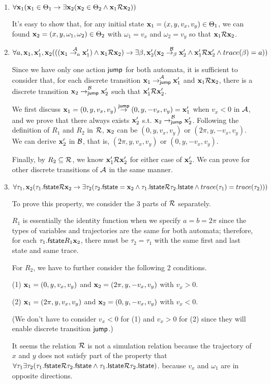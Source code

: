 \documentclass[11pt]{article}
\begin{document}
\begin{enumerate}
\item $\forall {\bf x}_1({\bf x}_1 \in \Theta_1 \to \exists {\bf x}_2({\bf x}_2 \in \Theta_2 \land {\bf x}_1 {\cal R} {\bf x}_2))$

It's easy to show that, for any initial state ${\bf x}_1 = (x, y, v_x, v_y) \in \Theta_1$,
we can found ${\bf x}_2 = (x, y, \omega_1, \omega_2) \in \Theta_2$ with $\omega_1 = v_x$ and $\omega_2 = v_y$
so that ${\bf x}_1 {\cal R} {\bf x}_2$.

\item $\forall a,{\bf x}_1,{\bf x}_1',{\bf x}_2((({\bf x}_1 \mathrel{\stackrel{{\cal A}}{\rightarrow_{a}}} {\bf x}_1') \land {\bf x}_1 {\cal R} {\bf x}_2) \to \exists \beta, {\bf x}_2'({\bf x}_2  \mathrel{\stackrel{{\cal B}}{\rightarrow_{\beta}}} {\bf x}_2' \land {\bf x}_1' {\cal R} {\bf x}_2' \land trace(\beta) = a))$

Since we have only one action ${\operatorname{\mathsf{jump}}}$ for both automata,
it is sufficient to consider that, for each discrete transition ${\bf x}_1 \mathrel{\stackrel{{\cal A}}{\rightarrow_{{\operatorname{\mathsf{jump}}}}}} {\bf x}_1'$ and ${\bf x}_1 {\cal R} {\bf x}_2$,
there is a discrete transition ${\bf x}_2 \mathrel{\stackrel{{\cal B}}{\rightarrow_{{\operatorname{\mathsf{jump}}}}}} {\bf x}_2'$ such that ${\bf x}_1' {\cal R} {\bf x}_2'$.

We first discuss ${\bf x}_1 = (0, y, v_x, v_y) \mathrel{\stackrel{{\operatorname{\mathsf{jump}}}}{\rightarrow}} (0, y, -v_x, v_y) = {\bf x}_1'$ when $v_x < 0$ in ${\cal A}$,
and we prove that there always exists ${\bf x}_2'$ s.t. ${\bf x}_2 \mathrel{\stackrel{{\cal B}}{\rightarrow_{{\operatorname{\mathsf{jump}}}}}} {\bf x}_2'$.
Following the definition of $R_1$ and $R_2$ in ${\cal R}$, ${\bf x}_2$ can be $(0, y, v_x, v_y)$ or $(2\pi, y, -v_x, v_y)$.
We can derive ${\bf x}_2'$ in ${\cal B}$, that is, $(2\pi, y, v_x, v_y)$ or $(0, y, -v_x, v_y)$.

Finally, by $R_2 \subseteq {\cal R}$, we know ${\bf x}_1' {\cal R} {\bf x}_2'$ for either case of ${\bf x}_2'$.
We can prove for other discrete transitions of ${\cal A}$ in the same manner.

\item $\forall \tau_1, {\bf x}_2(\tau_1.{\sf fstate} {\cal R} {\bf x}_2 \to 
       \exists \tau_2(\tau_2.{\sf fstate} = {\bf x}_2 \land \tau_1.{\sf lstate} {\cal R} \tau_2.{\sf lstate} \land trace(\tau_1) = trace(\tau_2)))$

To prove this property, we consider the 3 parts of ${\cal R}$ separately.

$R_1$ is essentially the identity function when we specify $a = b = 2\pi$
since the types of variables and trajectories are the same for both automata;
therefore, for each $\tau_1.{\sf fstate} R_1 {\bf x}_2$, there must be $\tau_2 = \tau_1$ with the same first and last state and same trace.

For $R_2$, we have to further consider the following 2 conditions.

(1) ${\bf x}_1 = (0, y, v_x, v_y)$ and ${\bf x}_2 = (2\pi, y, -v_x, v_y)$ with $v_x > 0$.

(2) ${\bf x}_1 = (2\pi, y, v_x, v_y)$ and ${\bf x}_2 = (0, y, -v_x, v_y)$ with $v_x < 0$.

(We don't have to consider $v_x < 0$ for (1) and $v_x > 0$ for (2) since they will enable discrete transition ${\operatorname{\mathsf{jump}}}$.)
{
\color{red}

It seems the relation ${\cal R}$ is not a simulation relation because the trajectory of $x$ and $y$ does not satisfy part of the property that 
$\forall \tau_1 \exists \tau_2(\tau_1.{\sf fstate} {\cal R} \tau_2.{\sf fstate} \land \tau_1.{\sf lstate} {\cal R} \tau_2.{\sf lstate})$.
because $v_x$ and $\omega_1$ are in opposite directions. 
}
\end{enumerate}
\end{document}
